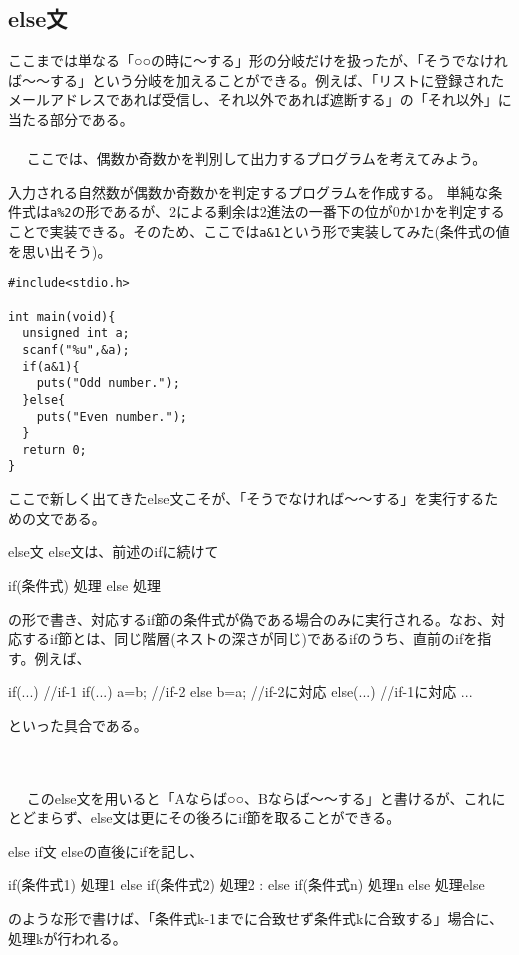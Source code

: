 \subsection{else文}
ここまでは単なる「○○の時に〜する」形の分岐だけを扱ったが、「そうでなければ〜〜する」という分岐を加えることができる。例えば、「リストに登録されたメールアドレスであれば受信し、それ以外であれば遮断する」の「それ以外」に当たる部分である。
\\ \\　
ここでは、偶数か奇数かを判別して出力するプログラムを考えてみよう。
\begin{boxnote}
\begin{multicols}{2}
入力される自然数が偶数か奇数かを判定するプログラムを作成する。
単純な条件式は\verb|a%2|の形であるが、2による剰余は2進法の一番下の位が0か1かを判定することで実装できる。そのため、ここでは\verb|a&1|という形で実装してみた(条件式の値を思い出そう)。
\begin{lstlisting}[caption=偶奇の判定,label=program4_2]
#include<stdio.h>

int main(void){
  unsigned int a;
  scanf("%u",&a);
  if(a&1){
    puts("Odd number.");
  }else{
    puts("Even number.");
  }
  return 0;
}
\end{lstlisting}
\end{multicols}
\end{boxnote}
ここで新しく出てきたelse文こそが、「そうでなければ〜〜する」を実行するための文である。
\begin{itembox}[l]{else文}
else文は、前述のifに続けて
\begin{code}
if(条件式){
  処理
}else{
  処理
}
\end{code}
の形で書き、対応するif節の条件式が偽である場合のみに実行される。なお、対応するif節とは、同じ階層(ネストの深さが同じ)であるifのうち、直前のifを指す。例えば、
\begin{code}
if(...){ //if-1
  if(...) a=b; //if-2
  else b=a; //if-2に対応
}else(...){ //if-1に対応
 ...
}
\end{code}
といった具合である。

\end{itembox}
\\ \\　
このelse文を用いると「Aならば○○、Bならば〜〜する」と書けるが、これにとどまらず、else文は更にその後ろにif節を取ることができる。
\begin{itembox}[l]{else if文}
elseの直後にifを記し、
\begin{code}
if(条件式1){
  処理1
}else if(条件式2){
  処理2
  :
}else if(条件式n){
  処理n
}else{
  処理else
}
\end{code}
のような形で書けば、「条件式k-1までに合致せず条件式kに合致する」場合に、処理kが行われる。
\end{itembox}
